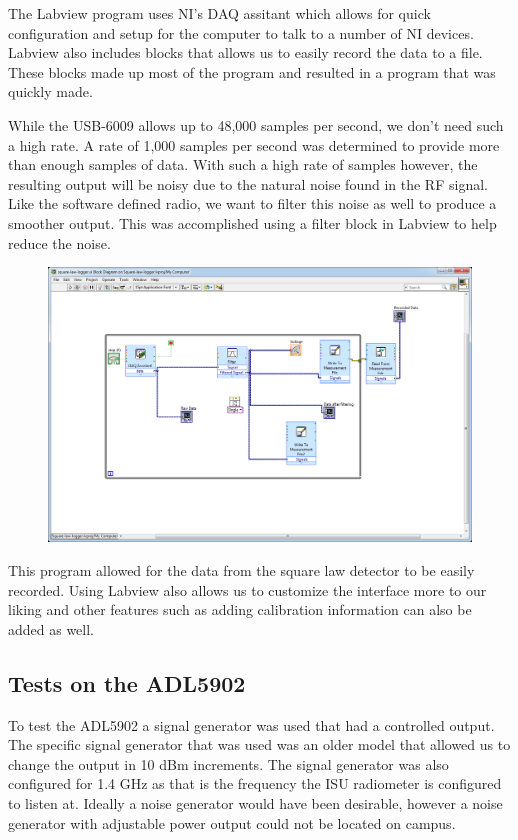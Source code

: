 The Labview program uses NI's DAQ assitant which allows for quick configuration and setup for the computer to talk to a number of NI devices.  Labview also includes blocks that allows us to easily record the data to a file.  These blocks made up most of the program and resulted in a program that was quickly made.  

While the USB-6009 allows up to 48,000 samples per second, we don't need such a high rate.  A rate of 1,000 samples per second was determined to provide more than enough samples of data.  With such a high rate of samples however, the resulting output will be noisy due to the natural noise found in the RF signal.  Like the software defined radio, we want to filter this noise as well to produce a smoother output.  This was accomplished using a filter block in Labview to help reduce the noise.

{\begin{figure}[h!tb] \centering
\includegraphics[width=\textwidth]{Images/labview-diagram.png}
\label{labviewblock}
\end{figure}
}

This program allowed for the data from the square law detector to be easily recorded.  Using Labview also allows us to customize the interface more to our liking and other features such as adding calibration information can also be added as well.  


\subsection{Tests on the ADL5902}
To test the ADL5902 a signal generator was used that had a controlled output.  The specific signal generator that was used was an older model that allowed us to change the output in 10 dBm increments.  The signal generator was also configured for 1.4 GHz as that is the frequency the ISU radiometer is configured to listen at.  Ideally a noise generator would have been desirable, however a noise generator with adjustable power output could not be located on campus.  

